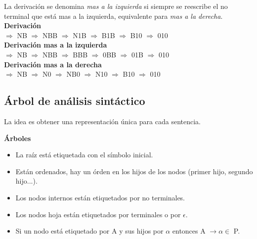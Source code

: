 \documentclass[\main/Apuntes_PL.tex]{subfiles}
\begin{document}
      \bigskip
      \par
      La derivación se denomina \textit{mas a la izquierda} si siempre se reescribe el no terminal que está mas a la izquierda, equivalente para \textit{mas a la derecha}.\\
      \vspace{3mm}
      \hspace{5mm}\textbf{Derivación}\\
       $\Rightarrow$ {\color{red}N}B $\Rightarrow$ N{\color{red}B}B $\Rightarrow$ {\color{red}N}1B $\Rightarrow$ B1{\color{red}B} $\Rightarrow$ {\color{red}B}10 $\Rightarrow$ 010\\
      \vspace{3mm}
      \hspace{5mm}\textbf{Derivación mas a la izquierda}\\
       $\Rightarrow$ {\color{red}N}B $\Rightarrow$ {\color{red}N}BB $\Rightarrow$ {\color{red}B}BB $\Rightarrow$ 0{\color{red}B}B $\Rightarrow$ 01{\color{red}B} $\Rightarrow$ 010\\
      \vspace{3mm}
      \hspace{5mm}\textbf{Derivación mas a la derecha}\\
       $\Rightarrow$ N{\color{red}B} $\Rightarrow$ {\color{red}N}0 $\Rightarrow$ N{\color{red}B}0 $\Rightarrow$ {\color{red}N}10 $\Rightarrow$ {\color{red}B}10 $\Rightarrow$ 010

    \subsection{Árbol de análisis sintáctico}
      \par
      La idea es obtener una representación única para cada sentencia.

      \bigskip
      \par
      \textbf{Árboles}
      \begin{itemize}
        \item La raíz está etiquetada con el símbolo inicial.
        \item Están ordenados, hay un órden en los hijos de los nodos (primer hijo, segundo hijo...).
        \item Los nodos internos están etiquetados por no terminales.
        \item Los nodos hoja están etiquetados por terminales o por $\epsilon$.
        \item Si un nodo está etiquetado por A y sus hijos por $\alpha$ entonces A $\rightarrow \alpha \in$ P.
      \end{itemize}
\end{document}
